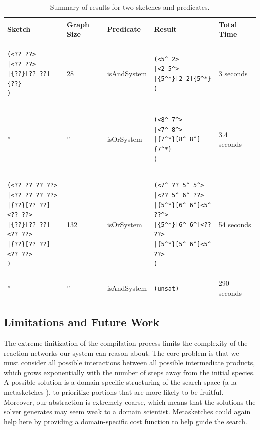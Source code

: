 \documentclass{article}[10pt]
\begin{document}
\begin{table}
\centering
\begin{tabular}{|l|l|l|l|l|}\hline
Sketch   & Graph Size & Predicate & Result & Total Time \\ \hline
\begin{lstlisting}[basicstyle=\scriptsize\ttfamily]
(<?? ??>
|<?? ??>
|{??}[?? ??]{??}
)
\end{lstlisting}
&
28
&
isAndSystem
&
\begin{lstlisting}[basicstyle=\scriptsize\ttfamily]
(<5^ 2>
|<2 5^>
|{5^*}[2 2]{5^*}
)
\end{lstlisting}
&
3 seconds
\\ \hline
''
&
''
&
isOrSystem
&
\begin{lstlisting}[basicstyle=\scriptsize\ttfamily]
(<8^ 7^>
|<7^ 8^>
|{7^*}[8^ 8^]{7^*}
)
\end{lstlisting}
&
3.4 seconds
\\ \hline
\begin{lstlisting}[basicstyle=\scriptsize\ttfamily]
(<?? ?? ?? ??>
|<?? ?? ?? ??>
|{??}[?? ??]<?? ??>
|{??}[?? ??]<?? ??>
|{??}[?? ??]<?? ??>
)
\end{lstlisting}
&
132
&
isOrSystem
&
\begin{lstlisting}[basicstyle=\scriptsize\ttfamily]
(<7^ ?? 5^ 5^>
|<?? 5^ 6^ ??>
|{5^*}[6^ 6^]<5^ ??^>
|{5^*}[6^ 6^]<?? ??>
|{5^*}[5^ 6^]<5^ ??>
)
\end{lstlisting}
&
54 seconds
\\ \hline
''
&
''
&
isAndSystem
&
\verb;(unsat);
&
290 seconds
\\ \hline
\end{tabular}
\caption{Summary of results for two sketches and predicates.}
\label{table:results}
\end{table}

\subsection{Limitations and Future Work}
The extreme finitization of the compilation process limits the complexity
of the reaction networks our system can reason about. The core problem is
that we must consider all possible interactions between all possible
intermediate products, which grows exponentially with the number of steps away
from the initial species. A possible solution
is a domain-specific structuring of the search space (a la metasketches
\cite{metasketches}), to prioritize portions that are more likely to be
fruitful. Moreover, our abstraction is extremely coarse, which means that the
solutions the solver generates may seem weak to a domain scientist.
Metasketches could again help here by providing a domain-specific
cost function to help guide the search.
\end{document}
